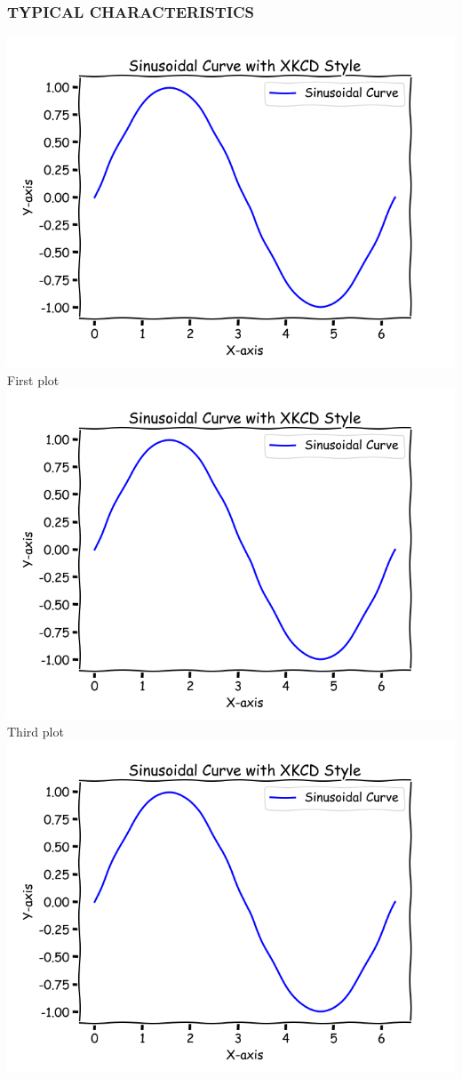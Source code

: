 \subsubsection*{TYPICAL CHARACTERISTICS}
\begin{multicols}{2}
    \centering
    \includegraphics[width=\columnwidth]{images/plot.png}
    First plot
    \vspace{5pt}
    \includegraphics[width=\columnwidth]{images/plot.png}
    Third plot
    \vspace{5pt}
    \includegraphics[width=\columnwidth]{images/plot.png}

\end{multicols}

